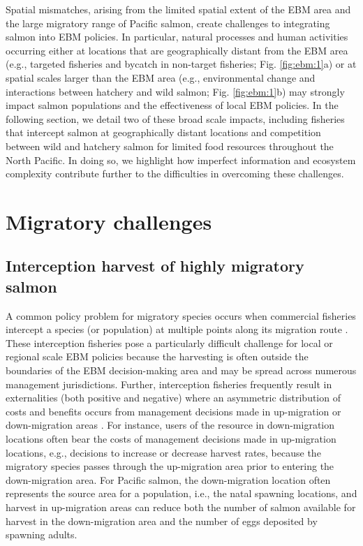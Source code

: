 Spatial mismatches, arising from the limited spatial extent of the EBM area and
the large migratory range of Pacific salmon, create challenges to integrating
salmon into EBM policies. In particular, natural processes and human activities
occurring either at locations that are geographically distant from the EBM area
(e.g., targeted fisheries and bycatch in non-target fisheries; Fig.
\ref{fig:ebm:1}a) or at spatial scales larger than the EBM area (e.g.,
environmental change and interactions between hatchery and wild salmon; Fig.
\ref{fig:ebm:1}b) may strongly impact salmon populations and the effectiveness
of local EBM policies. In the following section, we detail two of these broad
scale impacts, including fisheries that intercept salmon at geographically
distant locations and competition between wild and hatchery salmon for limited
food resources throughout the North Pacific. In doing so, we highlight how
imperfect information and ecosystem complexity contribute further to the
difficulties in overcoming these challenges.



\section{Migratory challenges}

\subsection{Interception harvest of highly migratory salmon}

A common policy problem for migratory species occurs when commercial
fisheries intercept a species (or population) at multiple points along
its migration route \citep{Lascelles2014}. These interception fisheries
pose a particularly difficult challenge for local or regional scale EBM
policies because the harvesting is often outside the boundaries of the
EBM decision-making area and may be spread across numerous management
jurisdictions. Further, interception fisheries frequently result in
externalities (both positive and negative) where an asymmetric
distribution of costs and benefits occurs from management decisions made
in up-migration or down-migration areas \citep{Scherer1990}. For
instance, users of the resource in down-migration locations often bear
the costs of management decisions made in up-migration locations, e.g.,
decisions to increase or decrease harvest rates, because the migratory
species passes through the up-migration area prior to entering the
down-migration area. For Pacific salmon, the down-migration location
often represents the source area for a population, i.e., the natal
spawning locations, and harvest in up-migration areas can reduce both
the number of salmon available for harvest in the down-migration area
and the number of eggs deposited by spawning adults.


